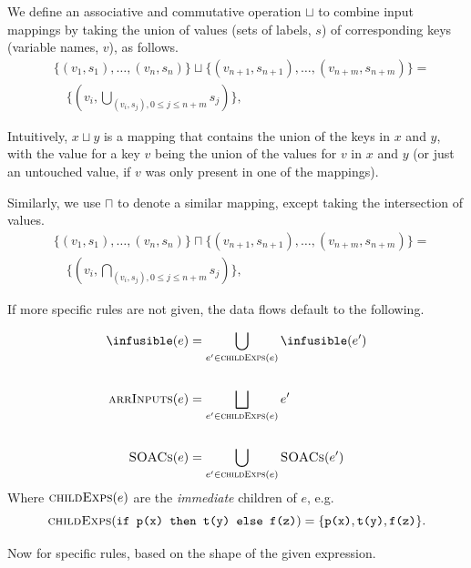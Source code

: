 \begin{description}
  We define an associative and commutative operation $\sqcup$ to
  combine input mappings by taking the union of values (sets of
  labels, $s$) of corresponding keys (variable names, $v$), as
  follows.
  \begin{align*}
  &\{(v_{1},s_{1}),\ldots,(v_{n},s_{n})\} \sqcup \{(v_{n+1},s_{n+1}),\ldots,(v_{n+m},s_{n+m})\} =\\
  &\quad \{(v_{i}, \bigcup_{(v_{i},s_{j}),0 \leq j \leq n+m} s_{j})\},
  \end{align*}

  Intuitively, $x \sqcup y$ is a mapping that contains the union of
  the keys in $x$ and $y$, with the value for a key $v$ being the
  union of the values for $v$ in $x$ and $y$ (or just an untouched
  value, if $v$ was only present in one of the mappings).

  Similarly, we use $\sqcap$ to denote a similar mapping, except
  taking the intersection of values.
\begin{align*}
  &\{(v_{1},s_{1}),\ldots,(v_{n},s_{n})\} \sqcap \{(v_{n+1},s_{n+1}),\ldots,(v_{n+m},s_{n+m})\} =\\
  &\quad \{(v_{i}, \bigcap_{(v_{i},s_{j}),0 \leq j \leq n+m} s_{j})\},
  \end{align*}
\end{description}

If more specific rules are not given, the data flows default to the
following.

\begin{align*}
  \infusible(e) &= \bigcup_{e'\in\childExps{e}} \infusible(e') \\
  \\
  \inputs(e) &= \bigsqcup_{e'\in\childExps{e}} e'\\
  \\
  \soacs(e) &= \bigcup_{e'\in\childExps{e}} \soacs(e')
\end{align*}
Where $\textsc{childExps}(e)$ are the \textit{immediate} children of $e$, e.g.
\[
\textsc{childExps}(\texttt{if p(x) then t(y) else f(z)}) = \{\texttt{p(x)}, \texttt{t(y)}, \texttt{f(z)}\}.
\]

Now for specific rules, based on the shape of the given expression.


